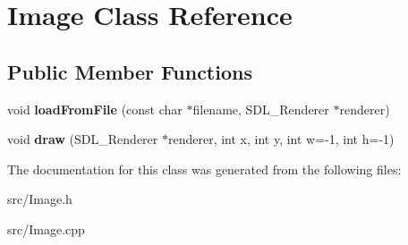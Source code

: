 \hypertarget{classImage}{}\section{Image Class Reference}
\label{classImage}
\subsection*{Public Member Functions}
\begin{DoxyCompactItemize}
\item 
void {\bfseries load\+From\+File} (const char $\ast$filename, S\+D\+L\+\_\+\+Renderer $\ast$renderer)\hypertarget{classImage_aa276b5183099671ddeaf8f083068046c}{}\label{classImage_aa276b5183099671ddeaf8f083068046c}

\item 
void {\bfseries draw} (S\+D\+L\+\_\+\+Renderer $\ast$renderer, int x, int y, int w=-\/1, int h=-\/1)\hypertarget{classImage_a82d6936d466ba0161d8b9cbacf613de5}{}\label{classImage_a82d6936d466ba0161d8b9cbacf613de5}

\end{DoxyCompactItemize}


The documentation for this class was generated from the following files\+:\begin{DoxyCompactItemize}
\item 
src/Image.\+h\item 
src/Image.\+cpp\end{DoxyCompactItemize}
